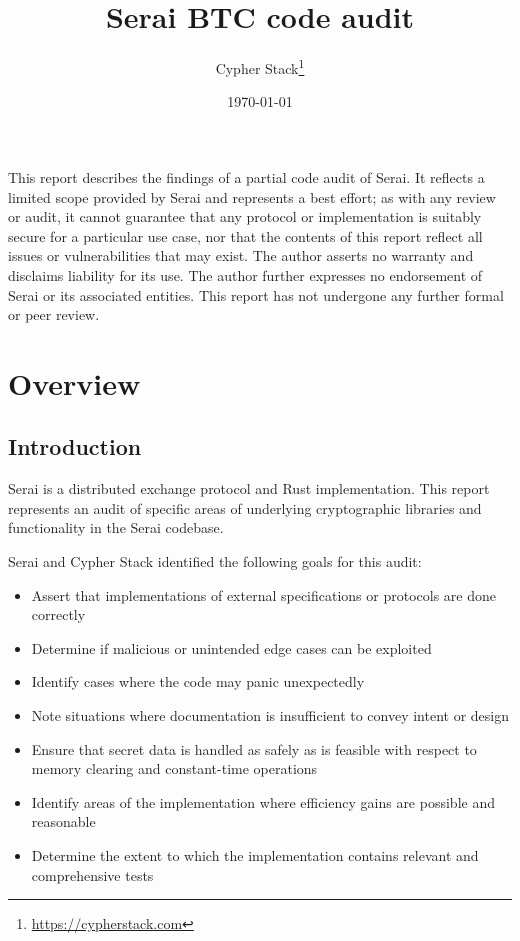 \documentclass{article}
\title{Serai BTC code audit}
\author{Cypher Stack\thanks{\url{https://cypherstack.com}}}
\date{\today}
\begin{document}
\maketitle

This report describes the findings of a partial code audit of Serai.
It reflects a limited scope provided by Serai and represents a best effort; as with any review or audit, it cannot guarantee that any protocol or implementation is suitably secure for a particular use case, nor that the contents of this report reflect all issues or vulnerabilities that may exist.
The author asserts no warranty and disclaims liability for its use.
The author further expresses no endorsement of Serai or its associated entities.
This report has not undergone any further formal or peer review.


\tableofcontents


\section{Overview}


\subsection{Introduction}

Serai is a distributed exchange protocol and Rust implementation.
This report represents an audit of specific areas of underlying cryptographic libraries and functionality in the Serai codebase.

Serai and Cypher Stack identified the following goals for this audit:
\begin{itemize}
\item Assert that implementations of external specifications or protocols are done correctly
\item Determine if malicious or unintended edge cases can be exploited
\item Identify cases where the code may panic unexpectedly
\item Note situations where documentation is insufficient to convey intent or design
\item Ensure that secret data is handled as safely as is feasible with respect to memory clearing and constant-time operations
\item Identify areas of the implementation where efficiency gains are possible and reasonable
\item Determine the extent to which the implementation contains relevant and comprehensive tests
\end{itemize}
\end{document}
